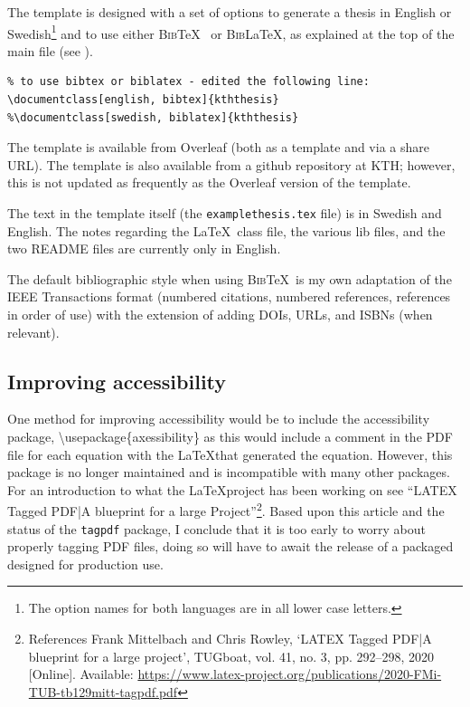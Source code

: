 The template is designed with a set of options to generate a thesis in English or Swedish\footnote{The option names for both languages are in all lower case letters.} and to use either \textsc{Bib}\TeX~ or \textsc{Bib}\LaTeX, as explained at the top of the main file (see ).
\begin{lstlisting}[language={[LaTeX]TeX}, caption={\textbackslash documentclass}, label=lst:document]
%% set the default language to english or swedish by passing an option to the documentclass - this handles the inside tile page
% to use bibtex or biblatex - edited the following line:
\documentclass[english, bibtex]{kththesis}
%\documentclass[swedish, biblatex]{kththesis}
\end{lstlisting}

The template is available from Overleaf (both as a template and via a share URL). The template is also available from a github repository at KTH; however, this is not updated as frequently as the Overleaf version of the template.

The text in the template itself (\ie the \texttt{examplethesis.tex} file) is in Swedish and English. The notes regarding the \LaTeX~class file, the various lib files, and the two README files are currently only in English.

The default bibliographic style when using \textsc{Bib}\TeX~is my own adaptation of the IEEE Transactions format (\ie numbered citations, numbered references, references in order of use) with the extension of adding DOIs, URLs, and ISBNs (when relevant).

\subsection{Improving accessibility}
\label{sec:improvingAccessibility}
One method for improving accessibility would be to include the accessibility package, \ie \textbackslash usepackage\{axessibility\} as this would include a comment in the PDF file for each equation with the \LaTeX that generated the equation. However, this package is no longer maintained and is incompatible with many other packages. For an introduction to what the \LaTeX\;project has been working on see “LATEX Tagged PDF|A blueprint for a large Project”\footnote{References
Frank Mittelbach and Chris Rowley, ‘LATEX Tagged PDF|A blueprint for a large project’, TUGboat, vol. 41, no. 3, pp. 292–298, 2020 [Online]. Available: \url{https://www.latex-project.org/publications/2020-FMi-TUB-tb129mitt-tagpdf.pdf}}. Based upon this article and the status of the \texttt{tagpdf} package, I conclude that it is too early to worry about properly tagging PDF files, doing so will have to await the release of a packaged designed for production use.

